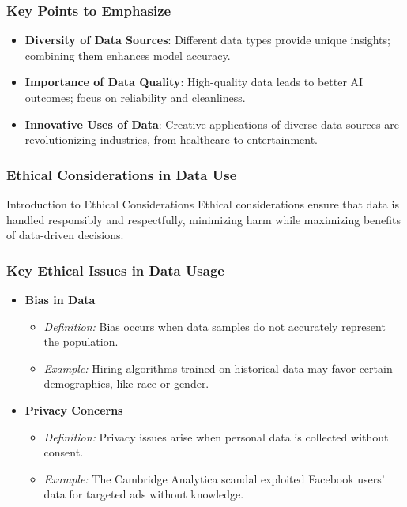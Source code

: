 \documentclass[aspectratio=169]{beamer}
\begin{document}
\begin{frame}[fragile]
    \frametitle{Key Points to Emphasize}
    \begin{itemize}
        \item \textbf{Diversity of Data Sources}: Different data types provide unique insights; combining them enhances model accuracy.
        \item \textbf{Importance of Data Quality}: High-quality data leads to better AI outcomes; focus on reliability and cleanliness.
        \item \textbf{Innovative Uses of Data}: Creative applications of diverse data sources are revolutionizing industries, from healthcare to entertainment.
    \end{itemize}
\end{frame}

\begin{frame}[fragile]
    \frametitle{Ethical Considerations in Data Use}
    \begin{block}{Introduction to Ethical Considerations}
        Ethical considerations ensure that data is handled responsibly and respectfully, minimizing harm while maximizing benefits of data-driven decisions.
    \end{block}
\end{frame}

\begin{frame}[fragile]
    \frametitle{Key Ethical Issues in Data Usage}
    \begin{itemize}
        \item \textbf{Bias in Data}
            \begin{itemize}
                \item \textit{Definition:} Bias occurs when data samples do not accurately represent the population.
                \item \textit{Example:} Hiring algorithms trained on historical data may favor certain demographics, like race or gender.
            \end{itemize}
        
        \item \textbf{Privacy Concerns}
            \begin{itemize}
                \item \textit{Definition:} Privacy issues arise when personal data is collected without consent.
                \item \textit{Example:} The Cambridge Analytica scandal exploited Facebook users' data for targeted ads without knowledge.
            \end{itemize}
    \end{itemize}
\end{frame}
\end{document}
